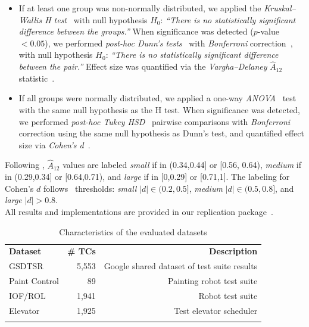 \begin{itemize}
    \item If at least one group was non-normally distributed, we applied the \textit{Kruskal\-–Wallis H test}~\citep{h_test} with null hypothesis $H_0$: \textit{``There is no statistically significant difference between the groups.''}  When significance was detected ($p$-value $< 0.05$), we performed \textit{post-hoc Dunn's tests}~\citep{dunn_test} with \textit{Bonferroni} correction~\citep{weele2019bonferroni}, with null hypothesis $H_0$: \textit{``There is no statistically significant difference between the pair.''} Effect size was quantified via the \textit{Vargha–Delaney} $\hat{A}_{12}$ statistic~\citep{a12}.
    \item If all groups were normally distributed, we applied a one-way \textit{ANOVA}~\citep{anova} test with the same null hypothesis as the H test. When significance was detected, we performed \textit{post-hoc Tukey HSD}~\citep{tuckey} pairwise comparisons with \textit{Bonferroni} correction using the same null hypothesis as Dunn's test, and quantified effect size via \textit{Cohen's d}~\citep{conover1998cohen}.
\end{itemize}

Following \citet{selectqa}, $\hat{A}_{12}$ values are labeled \textit{small} if in (0.34,0.44] or [0.56, 0.64), \textit{medium} if in (0.29,0.34] or [0.64,0.71), and \textit{large} if in [0,0.29] or [0.71,1]. The labeling for Cohen's $d$ follows~\citep{panichella2014improving} thresholds: \textit{small} $|d| \in (0.2, 0.5]$, \textit{medium} $|d| \in (0.5, 0.8]$, and \textit{large} $|d| > 0.8$.\\

All results and implementations are provided in our replication package~\citep{appendix}.


\begin{table}[ht]
\footnotesize
\centering
\caption{Characteristics of the evaluated datasets}\label{table:datasets}
\begin{tabular}{@{}lrr@{}}
\hline\noalign{\smallskip}
\textbf{Dataset} & \textbf{\# TCs} & \textbf{Description} \\
\noalign{\smallskip}\hline\noalign{\smallskip}
GSDTSR    & 5,553   & Google shared dataset of test suite results \\
Paint Control    & 89   & Painting robot test suite \\
IOF/ROL    & 1,941   & Robot test suite \\
Elevator    & 1,925   & Test elevator scheduler \\
\noalign{\smallskip}\hline
\end{tabular}
\end{table}

